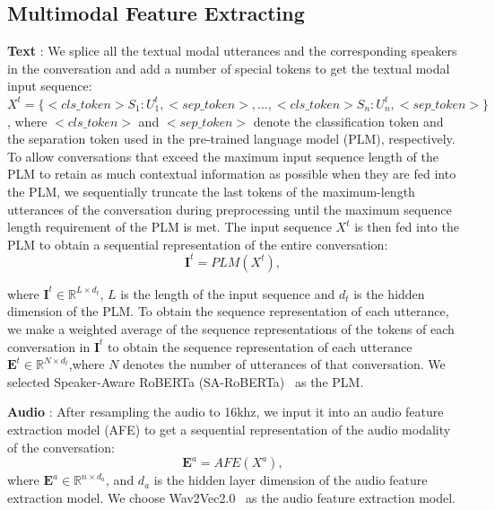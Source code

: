 \documentclass[11pt]{article}
\begin{document}
\subsection{Multimodal Feature Extracting}
\label{appendix-c.1}
\textbf{Text} : We splice all the textual modal utterances and the corresponding speakers in the conversation and add a number of special tokens to get the textual modal input sequence:
$X^t = \{<cls\_token> S_1:U_1^t, <sep\_token>, \dots, <cls\_token>S_n:U_n^t, <sep\_token> \}$,
where $<cls\_token>$ and $<sep\_token>$ denote the classification token and the separation token used in the pre-trained language model (PLM), respectively.
To allow conversations that exceed the maximum input sequence length of the PLM to retain as much contextual information as possible when they are fed into the PLM, we sequentially truncate the last tokens of the maximum-length utterances of the conversation during preprocessing until the maximum sequence length requirement of the PLM is met.
The input sequence $X^t$ is then fed into the PLM to obtain a sequential representation of the entire conversation:
\begin{equation}
\bm{I}^t = PLM(X^t),
\end{equation}

where $\bm{I}^t \in \mathbb{R}^{L \times d_t}$, $L$ is the length of the input sequence and $d_t$ is the hidden dimension of the PLM.
To obtain the sequence representation of each utterance, we make a weighted average of the sequence representations of the tokens of each conversation in $\bm{I}^t$ to obtain the sequence representation of each utterance $\bm{E}^t \in \mathbb{R}^{N \times d_t}$,where $N$ denotes the number of utterances of that conversation.
We selected Speaker-Aware RoBERTa (SA-RoBERTa)~\cite{SA-RoBERTa} as the PLM.

\textbf{Audio} : After resampling the audio to 16khz, we input it into an audio feature extraction model (AFE) to get a sequential representation of the audio modality of the conversation:
\begin{equation}
\bm{E}^a = AFE(X^a),
\end{equation}
where $\bm{E}^a \in \mathbb{R}^{n \times d_a}$, and $d_a$ is the hidden layer dimension of the audio feature extraction model. 
We choose Wav2Vec2.0~\cite{wav2vec2} as the audio feature extraction model.
\end{document}
